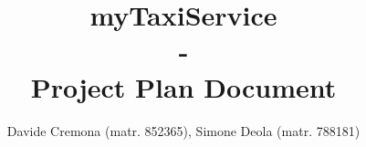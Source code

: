 \documentclass{report}
\begin{document}
\title{\textbf{myTaxiService} \\-\\ \textbf{Project Plan Document}}
\author{Davide Cremona (matr. 852365), Simone Deola (matr. 788181)}
 
\maketitle

\tableofcontents








 
\end{document}
